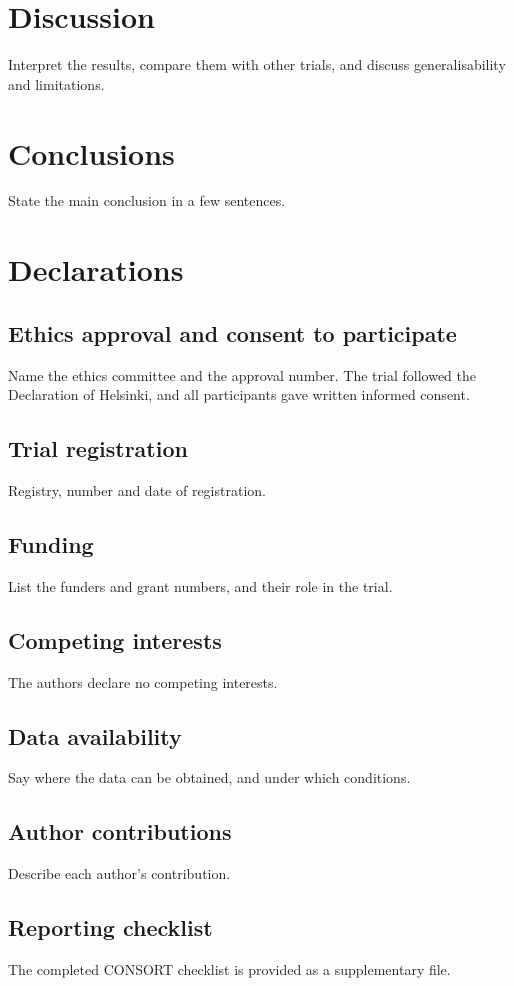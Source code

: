 \documentclass[11pt,a4paper]{article}
\begin{document}
\section{Discussion}
Interpret the results, compare them with other trials, and discuss
generalisability and limitations.

\section{Conclusions}
State the main conclusion in a few sentences.

\section*{Declarations}
\subsection*{Ethics approval and consent to participate}
Name the ethics committee and the approval number. The trial followed the
Declaration of Helsinki,\cite{wma2013helsinki} and all participants gave
written informed consent.

\subsection*{Trial registration}
Registry, number and date of registration.

\subsection*{Funding}
List the funders and grant numbers, and their role in the trial.

\subsection*{Competing interests}
The authors declare no competing interests.

\subsection*{Data availability}
Say where the data can be obtained, and under which conditions.

\subsection*{Author contributions}
Describe each author's contribution.

\subsection*{Reporting checklist}
The completed CONSORT checklist is provided as a supplementary file.



\end{document}
